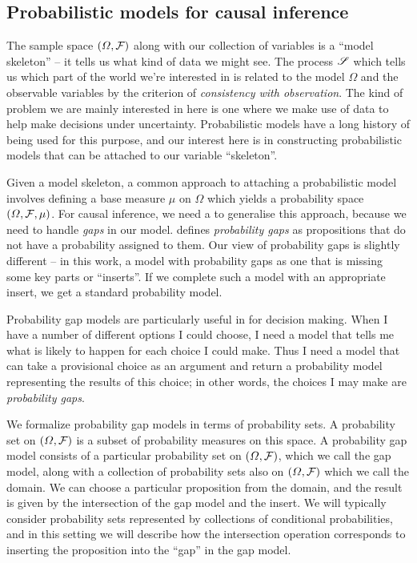 \subsection{Probabilistic models for causal inference}

The sample space $(\Omega,\mathcal{F})$ along with our collection of variables is a ``model skeleton'' -- it tells us what kind of data we might see. The process $\mathscr{S}$ which tells us which part of the world we're interested in is related to the model $\Omega$ and the observable variables by the criterion of \emph{consistency with observation}. The kind of problem we are mainly interested in here is one where we make use of data to help make decisions under uncertainty. Probabilistic models have a long history of being used for this purpose, and our interest here is in constructing probabilistic models that can be attached to our variable ``skeleton''. 

Given a model skeleton, a common approach to attaching a probabilistic model involves defining a base measure $\mu$ on $\Omega$ which yields a probability space $(\Omega,\mathcal{F},\mu)$. For causal inference, we need a to generalise this approach, because we need to handle \emph{gaps} in our model. \citet{hajek_what_2003} defines \emph{probability gaps} as propositions that do not have a probability assigned to them. Our view of probability gaps is slightly different -- in this work, a model with probability gaps as one that is missing some key parts or ``inserts''. If we complete such a model with an appropriate insert, we get a standard probability model.

Probability gap models are particularly useful in for decision making. When I have a number of different options I could choose, I need a model that tells me what is likely to happen for each choice I could make. Thus I need a model that can take a provisional choice as an argument and return a probability model representing the results of this choice; in other words, the choices I may make are \emph{probability gaps}.

We formalize probability gap models in terms of probability sets. A probability set on $(\Omega,\mathcal{F})$ is a subset of probability measures on this space. A probability gap model consists of a particular probability set on $(\Omega,\mathcal{F})$, which we call the gap model, along with a collection of probability sets also on $(\Omega,\mathcal{F})$ which we call the domain. We can choose a particular proposition from the domain, and the result is given by the intersection of the gap model and the insert. We will typically consider probability sets represented by collections of conditional probabilities, and in this setting we will describe how the intersection operation corresponds to inserting the proposition into the ``gap'' in the gap model.

